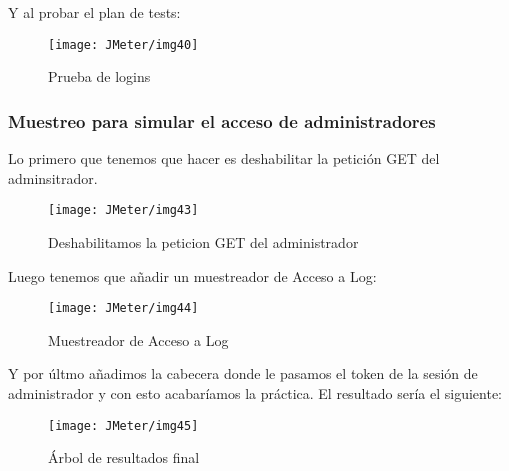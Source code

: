 Y al probar el plan de tests:

\begin{figure}[H]
    \centering
    \texttt{[image: JMeter/img40]}
    \caption{Prueba de logins}
\end{figure}

\subsubsection{Muestreo para simular el acceso de administradores}
Lo primero que tenemos que hacer es deshabilitar la petición GET del adminsitrador.

\begin{figure}[H]
    \centering
    \texttt{[image: JMeter/img43]}
    \caption{Deshabilitamos la peticion GET del administrador}
\end{figure}

Luego tenemos que añadir un muestreador de Acceso a Log:

\begin{figure}[H]
    \centering
    \texttt{[image: JMeter/img44]}
    \caption{Muestreador de Acceso a Log}
\end{figure}

Y por últmo añadimos la cabecera donde le pasamos el token de la sesión de administrador y con esto acabaríamos la práctica.
El resultado sería el siguiente:

\begin{figure}[H]
    \centering
    \texttt{[image: JMeter/img45]}
    \caption{Árbol de resultados final}
\end{figure}